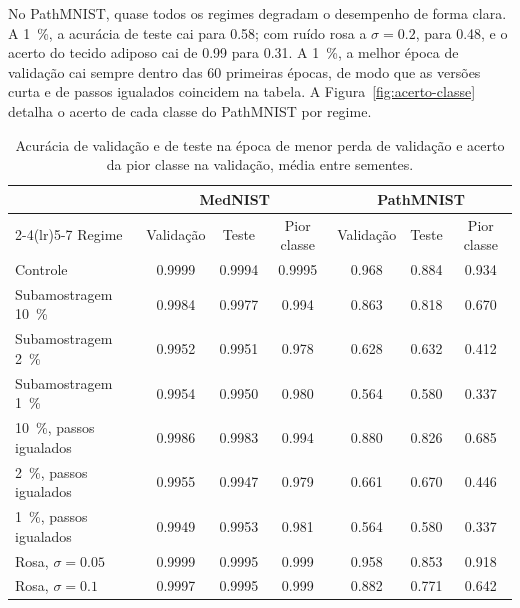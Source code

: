 No PathMNIST, quase todos os regimes degradam o desempenho de forma clara. A
\SI{1}{\percent}, a acurácia de teste cai para \num{0,58}; com ruído rosa a
$\sigma = \num{0,2}$, para \num{0,48}, e o acerto do tecido adiposo cai de
\num{0,99} para \num{0,31}. A \SI{1}{\percent}, a melhor época de validação cai
sempre dentro das 60 primeiras épocas, de modo que as versões curta e de passos
igualados coincidem na tabela. A Figura~\ref{fig:acerto-classe} detalha o
acerto de cada classe do PathMNIST por regime.

\begin{table}[H]
  \centering
  \caption{Acurácia de validação e de teste na época de menor perda de
  validação e acerto da pior classe na validação, média entre sementes.}
  \label{tab:desempenho}
  \footnotesize
  \begin{tabular}{lcccccc}
    \toprule
    & \multicolumn{3}{c}{MedNIST} & \multicolumn{3}{c}{PathMNIST} \\
    \cmidrule(lr){2-4}\cmidrule(lr){5-7}
    Regime & Validação & Teste & Pior classe & Validação & Teste & Pior classe \\
    \midrule
    Controle                        & \num{0,9999} & \num{0,9994} & \num{0,9995} & \num{0,968} & \num{0,884} & \num{0,934} \\
    Subamostragem \SI{10}{\percent} & \num{0,9984} & \num{0,9977} & \num{0,994}  & \num{0,863} & \num{0,818} & \num{0,670} \\
    Subamostragem \SI{2}{\percent}  & \num{0,9952} & \num{0,9951} & \num{0,978}  & \num{0,628} & \num{0,632} & \num{0,412} \\
    Subamostragem \SI{1}{\percent}  & \num{0,9954} & \num{0,9950} & \num{0,980}  & \num{0,564} & \num{0,580} & \num{0,337} \\
    \SI{10}{\percent}, passos igualados & \num{0,9986} & \num{0,9983} & \num{0,994} & \num{0,880} & \num{0,826} & \num{0,685} \\
    \SI{2}{\percent}, passos igualados  & \num{0,9955} & \num{0,9947} & \num{0,979} & \num{0,661} & \num{0,670} & \num{0,446} \\
    \SI{1}{\percent}, passos igualados  & \num{0,9949} & \num{0,9953} & \num{0,981} & \num{0,564} & \num{0,580} & \num{0,337} \\
    Rosa, $\sigma = \num{0,05}$   & \num{0,9999} & \num{0,9995} & \num{0,999} & \num{0,958} & \num{0,853} & \num{0,918} \\
    Rosa, $\sigma = \num{0,1}$    & \num{0,9997} & \num{0,9995} & \num{0,999} & \num{0,882} & \num{0,771} & \num{0,642} \\

\end{tabular}
\end{table}
